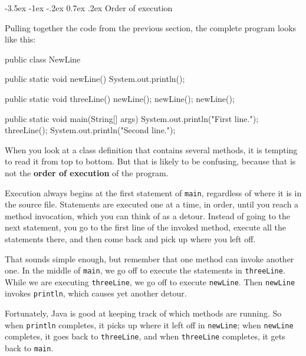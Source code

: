 \documentclass[12pt]{book}
\makeatletter
\theoremstyle{exercise}
\newcommand{\java}[1]{\verb"#1"}
\renewcommand{\section}{\@startsection{section}{1}{\z@}%
    {-3.5ex \@plus -1ex \@minus -.2ex}%
    {0.7ex \@plus.2ex}%
    {\normalfont\Large\bfseries}}
\newcommand{\java}[1]{\lstinline{#1}} %
\makeatother
\begin{document}


\section{Order of execution}


Pulling together the code from the previous section, the complete program looks like this:

\begin{code}
public class NewLine {

    public static void newLine() {
        System.out.println();
    }

    public static void threeLine() {
        newLine();
        newLine();
        newLine();
    }

    public static void main(String[] args) {
        System.out.println("First line.");
        threeLine();
        System.out.println("Second line.");
    }
}
\end{code}


When you look at a class definition that contains several methods, it is tempting to read it from top to bottom.
But that is likely to be confusing, because that is not the {\bf order of execution} of the program.

Execution always begins at the first statement of \java{main}, regardless of where it is in the source file.
Statements are executed one at a time, in order, until you reach a method invocation, which you can think of as a detour.
Instead of going to the next statement, you go to the first line of the invoked method, execute all the statements there, and then come back and pick up where you left off.

That sounds simple enough, but remember that one method can invoke another one.
In the middle of \java{main}, we go off to execute the statements in \java{threeLine}.
While we are executing \java{threeLine}, we go off to execute \java{newLine}.
Then \java{newLine} invokes \java{println}, which causes yet another detour.

Fortunately, Java is good at keeping track of which methods are running.
So when \java{println} completes, it picks up where it left off in \java{newLine}; when \java{newLine} completes, it goes back to \java{threeLine}, and when \java{threeLine} completes, it gets back to \java{main}.
\end{document}
